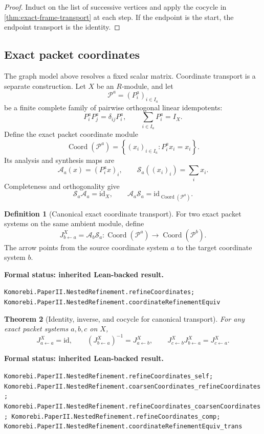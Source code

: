\documentclass[11pt]{article}
\newtheorem{theorem}{Theorem}[section]
\theoremstyle{definition}
\newtheorem{definition}[theorem]{Definition}
\theoremstyle{remark}
\newcommand{\cA}{\mathcal A}
\newcommand{\cP}{\mathcal P}
\newcommand{\cS}{\mathcal S}
\newcommand{\id}{\mathrm{id}}
\newcommand{\Coord}{\operatorname{Coord}}
\newcommand{\leanname}[1]{\nolinkurl{#1}}
\newcommand{\statusleanprior}[1]{%
  \par\smallskip\noindent
  {\color{leanblue}\textbf{Formal status: inherited Lean-backed result.}}\par
  \begingroup\small\raggedright\leanname{#1}\par\endgroup\smallskip}
\begin{document}
\begin{proof}
Induct on the list of successive vertices and apply the cocycle in
\cref{thm:exact-frame-transport} at each step.  If the endpoint is the start,
the endpoint transport is the identity.
\end{proof}

\subsection{Exact packet coordinates}

The graph model above resolves a fixed scalar matrix.  Coordinate transport
is a separate construction.  Let $X$ be an $R$-module, and let
\[
\cP^a=(P^a_i)_{i\in I_a}
\]
be a finite complete family of pairwise orthogonal linear idempotents:
\[
P^a_iP^a_j=\delta_{ij}P^a_i,
\qquad
\sum_{i\in I_a}P^a_i=I_X.
\]
Define the exact packet coordinate module
\[
\Coord(\cP^a)
=
\left\{(x_i)_{i\in I_a}:P^a_ix_i=x_i\right\}.
\]
Its analysis and synthesis maps are
\[
\cA_a(x)=(P^a_ix)_i,
\qquad
\cS_a((x_i)_i)=\sum_ix_i.
\]
Completeness and orthogonality give
\[
\cS_a\cA_a=\id_X,
\qquad
\cA_a\cS_a=\id_{\Coord(\cP^a)}.
\]

\begin{definition}[Canonical exact coordinate transport]
\label{def:canonical-J}
For two exact packet systems on the same ambient module, define
\[
  J^X_{b\leftarrow a}
  =
  \cA_b\cS_a:
  \Coord(\cP^a)\longrightarrow\Coord(\cP^b).
\]
The arrow points from the source coordinate system $a$ to the target
coordinate system $b$.
\end{definition}
\statusleanprior{Komorebi.PaperII.NestedRefinement.refineCoordinates; Komorebi.PaperII.NestedRefinement.coordinateRefinementEquiv}

\begin{theorem}[Identity, inverse, and cocycle for canonical transport]
\label{thm:J-cocycle}
For any exact packet systems $a,b,c$ on $X$,
\[
J^X_{a\leftarrow a}=\id,
\qquad
\left(J^X_{b\leftarrow a}\right)^{-1}=J^X_{a\leftarrow b},
\qquad
J^X_{c\leftarrow b}J^X_{b\leftarrow a}=J^X_{c\leftarrow a}.
\]
\end{theorem}
\statusleanprior{Komorebi.PaperII.NestedRefinement.refineCoordinates_self; Komorebi.PaperII.NestedRefinement.coarsenCoordinates_refineCoordinates; Komorebi.PaperII.NestedRefinement.refineCoordinates_coarsenCoordinates; Komorebi.PaperII.NestedRefinement.refineCoordinates_comp; Komorebi.PaperII.NestedRefinement.coordinateRefinementEquiv_trans}
\end{document}
